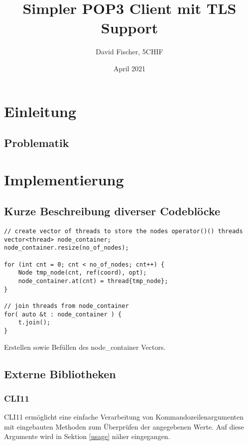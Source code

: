 \documentclass[12pt, letterpaper]{article}
\title{Simpler POP3 Client mit TLS Support}
\author{David Fischer, 5CHIF}
\date{April 2021}
\newenvironment{code}{\captionsetup{type=listing}}{}
\begin{document}
\begin{titlepage}
\maketitle
\end{titlepage}

\tableofcontents
\newpage

\section{Einleitung}

\subsection{Problematik}


\section{Implementierung}

\subsection{Kurze Beschreibung diverser Codeblöcke}


\begin{code}
\begin{verbatim}
// create vector of threads to store the nodes operator()() threads
vector<thread> node_container;
node_container.resize(no_of_nodes);

for (int cnt = 0; cnt < no_of_nodes; cnt++) {
    Node tmp_node(cnt, ref(coord), opt);
    node_container.at(cnt) = thread{tmp_node};
}

// join threads from node_container
for( auto &t : node_container ) {
    t.join();
}
\end{verbatim}
\caption{Erstellen sowie Befüllen des node\_container Vectors.}
\label{thread_vector_ref}
\end{code}


\subsection{Externe Bibliotheken}
\label{extBib}

\subsubsection{CLI11}
CLI11\cite{cli11_ref} ermöglicht eine einfache Verarbeitung von Kommandozeilenargumenten mit eingebauten Methoden zum Überprüfen der angegebenen Werte. Auf diese Argumente wird in Sektion \ref{usage} näher eingegangen.
\end{document}
